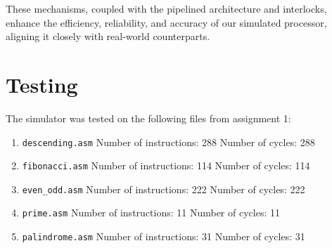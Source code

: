 \documentclass[12pt,a4paper]{article}
\begin{document}
These mechanisms, coupled with the pipelined architecture and interlocks, enhance the efficiency, reliability, and accuracy of our simulated processor, aligning it closely with real-world counterparts.

\section{Testing}
The simulator was tested on the following files from assignment 1:
\begin{enumerate}
    \item \texttt{descending.asm}
        \subitem Number of instructions: 288
        \subitem Number of cycles: 288
    \item \texttt{fibonacci.asm}
        \subitem Number of instructions: 114
        \subitem Number of cycles: 114
    \item \texttt{even\_odd.asm}
        \subitem Number of instructions: 222
        \subitem Number of cycles: 222
    \item \texttt{prime.asm}
        \subitem Number of instructions: 11
        \subitem Number of cycles: 11
    \item \texttt{palindrome.asm}
        \subitem Number of instructions: 31
        \subitem Number of cycles: 31
\end{enumerate}
\end{document}
